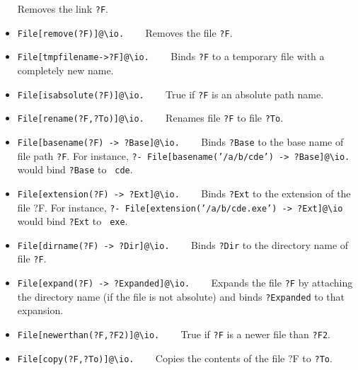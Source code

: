 \documentclass[11pt]{article}
\newcommand{\bs}{\textbackslash}
\begin{document}
\begin{itemize}
  Removes the link {\tt ?F}. 
\item \texttt{File[remove(?F)]@\bs{}io.}  ~~~
  Removes the file {\tt ?F}. 
\item \texttt{File[tmpfilename->?F]@\bs{}io.}  ~~~
  Binds {\tt ?F} to a temporary file with a completely new name. 
\item \texttt{File[isabsolute(?F)]@\bs{}io.}  ~~~
  True if {\tt ?F} is an absolute path name. 
\item \texttt{File[rename(?F,?To)]@\bs{}io.}  ~~~
  Renames file {\tt ?F} to file {\tt ?To}.  
\item \texttt{File[basename(?F) -> ?Base]@\bs{}io.}  ~~~
  Binds {\tt ?Base} to the base name of file path {\tt ?F}. For instance, 
  {\tt ?- File[basename('/a/b/cde') -> ?Base]@\bs{}io.} would bind {\tt ?Base} to {\tt
    cde}.  
\item \texttt{File[extension(?F) -> ?Ext]@\bs{}io.}  ~~~
  Binds {\tt ?Ext} to the extension of the file ?F. For instance, 
  {\tt ?- File[extension('/a/b/cde.exe') -> ?Ext]@\bs{}io} would bind {\tt ?Ext} to {\tt
    exe}.  
\item \texttt{File[dirname(?F) -> ?Dir]@\bs{}io.}  ~~~
  Binds {\tt ?Dir} to the directory name of file {\tt ?F}.  
\item \texttt{File[expand(?F) -> ?Expanded]@\bs{}io.}  ~~~
  Expands the file {\tt ?F} by attaching the directory name (if the file is
  not absolute) and binds {\tt ?Expanded} to that expansion.  
\item \texttt{File[newerthan(?F,?F2)]@\bs{}io.}  ~~~
  True if {\tt ?F} is a newer file than {\tt ?F2}. 
\item \texttt{File[copy(?F,?To)]@\bs{}io.}  ~~~
  Copies the contents of the file ?F to {\tt ?To}. 
\end{itemize}
\end{document}
